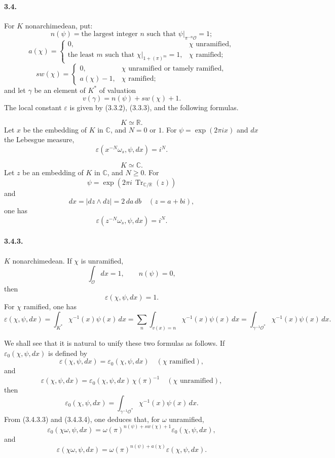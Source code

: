 \documentclass[10pt]{article}
\newcommand{\C}{\mathbb C}
\newcommand{\Tr}{\operatorname{Tr}}
\providecommand{\R}{\mathbb R}
\begin{document}
\paragraph{3.4.} For \(K\) nonarchimedean, put:
\[
n(\psi)=\text{the largest integer }n\text{ such that }\psi|_{\pi^{-n}\mathcal O}=1;
\]
\[
a(\chi)=
\begin{cases}
0,&\chi\text{ unramified},\\
\text{the least }m\text{ such that }\chi|_{1+(\pi)^m}=1,&\chi\text{ ramified};
\end{cases}
\]
\[
sw(\chi)=
\begin{cases}
0,&\chi\text{ unramified or tamely ramified},\\
a(\chi)-1,&\chi\text{ ramified};
\end{cases}
\]
and let \(\gamma\) be an element of \(K^*\) of valuation
\[
v(\gamma)=n(\psi)+sw(\chi)+1.
\]
The local constant \(\varepsilon\) is given by (3.3.2), (3.3.3), and the following formulas.

\[
\tag{3.4.1}
K\simeq\R.
\]
Let \(x\) be the embedding of \(K\) in \(\C\), and \(N=0\) or \(1\). For \(\psi=\exp(2\pi ix)\) and \(dx\) the Lebesgue measure,
\[
\varepsilon(x^{-N}\omega_s,\psi,dx)=i^N.
\]

\[
\tag{3.4.2}
K\simeq\C.
\]
Let \(z\) be an embedding of \(K\) in \(\C\), and \(N\ge0\). For
\[
\psi=\exp(2\pi i\,\Tr_{\C/\R}(z))
\]
and
\[
dx=|dz\wedge d\overline z|=2\,da\,db\quad(z=a+bi),
\]
one has
\[
\varepsilon(z^{-N}\omega_s,\psi,dx)=i^N.
\]

\paragraph{3.4.3.} \(K\) nonarchimedean. If \(\chi\) is unramified,
\[
\int_{\mathcal O}dx=1,\qquad n(\psi)=0,
\]
then
\[
\tag{3.4.3.1}
\varepsilon(\chi,\psi,dx)=1.
\]
For \(\chi\) ramified, one has
\[
\tag{3.4.3.2}
\varepsilon(\chi,\psi,dx)=
\int_{K^*}\chi^{-1}(x)\psi(x)\,dx
=
\sum_n\int_{v(x)=n}\chi^{-1}(x)\psi(x)\,dx
=
\int_{\gamma^{-1}\mathcal O^*}\chi^{-1}(x)\psi(x)\,dx.
\]

We shall see that it is natural to unify these two formulas as follows. If \(\varepsilon_0(\chi,\psi,dx)\) is defined by
\[
\varepsilon(\chi,\psi,dx)=\varepsilon_0(\chi,\psi,dx)
\quad(\chi\text{ ramified}),
\]
and
\[
\tag{3.4.3.3}
\varepsilon(\chi,\psi,dx)=\varepsilon_0(\chi,\psi,dx)\,\chi(\pi)^{-1}
\quad(\chi\text{ unramified}),
\]
then
\[
\tag{3.4.3.4}
\varepsilon_0(\chi,\psi,dx)=
\int_{\gamma^{-1}\mathcal O^*}\chi^{-1}(x)\psi(x)\,dx.
\]
From (3.4.3.3) and (3.4.3.4), one deduces that, for \(\omega\) unramified,
\[
\tag{3.4.3.5}
\varepsilon_0(\chi\omega,\psi,dx)
=
\omega(\pi)^{n(\psi)+sw(\chi)+1}\varepsilon_0(\chi,\psi,dx),
\]
and
\[
\varepsilon(\chi\omega,\psi,dx)
=
\omega(\pi)^{n(\psi)+a(\chi)}\varepsilon(\chi,\psi,dx).
\]
\end{document}
